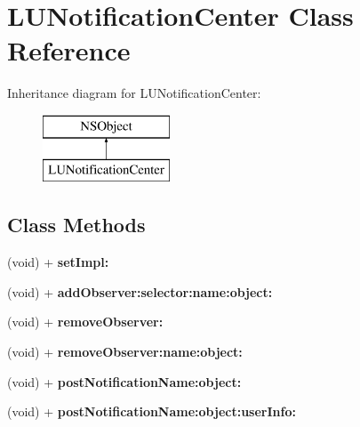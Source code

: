 \hypertarget{interface_l_u_notification_center}{}\section{L\+U\+Notification\+Center Class Reference}
\label{interface_l_u_notification_center}
Inheritance diagram for L\+U\+Notification\+Center\+:\begin{figure}[H]
\begin{center}
\leavevmode
\includegraphics[height=2.000000cm]{interface_l_u_notification_center}
\end{center}
\end{figure}
\subsection*{Class Methods}
\begin{DoxyCompactItemize}
\item 
\mbox{\label{interface_l_u_notification_center_adbddf970195c47d1b40229744f8c73a2}} 
(void) + {\bfseries set\+Impl\+:}
\item 
\mbox{\label{interface_l_u_notification_center_aea16a3855d6ac2afa844ad4d249b4122}} 
(void) + {\bfseries add\+Observer\+:selector\+:name\+:object\+:}
\item 
\mbox{\label{interface_l_u_notification_center_aacef415bc2b2717d919fc301bc3efd7c}} 
(void) + {\bfseries remove\+Observer\+:}
\item 
\mbox{\label{interface_l_u_notification_center_a59f917001a652927abf1f58d150e9835}} 
(void) + {\bfseries remove\+Observer\+:name\+:object\+:}
\item 
\mbox{\label{interface_l_u_notification_center_a7555ea329b1bb863204e82c1d8e2041f}} 
(void) + {\bfseries post\+Notification\+Name\+:object\+:}
\item 
\mbox{\label{interface_l_u_notification_center_ab083ab1ee01381233626a1a5155a8aad}} 
(void) + {\bfseries post\+Notification\+Name\+:object\+:user\+Info\+:}
\end{DoxyCompactItemize}


